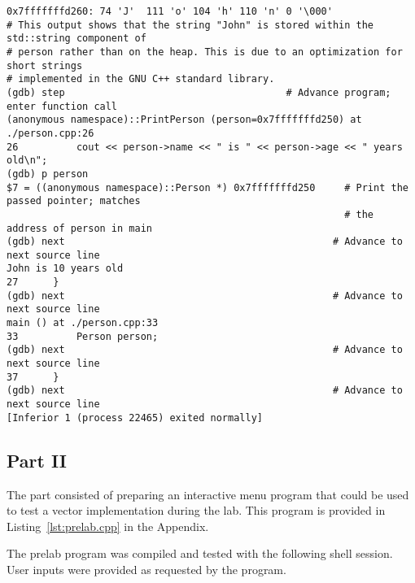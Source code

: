 \documentclass[11pt, letterpaper]{article} %
\begin{document}
\begin{lstlisting}[style=labreportstyle-sh,escapechar=!]
0x7fffffffd260: 74 'J'  111 'o' 104 'h' 110 'n' 0 '\000'
# This output shows that the string "John" is stored within the std::string component of
# person rather than on the heap. This is due to an optimization for short strings
# implemented in the GNU C++ standard library.
(gdb) step                                      # Advance program; enter function call
(anonymous namespace)::PrintPerson (person=0x7fffffffd250) at ./person.cpp:26
26          cout << person->name << " is " << person->age << " years old\n";
(gdb) p person
$7 = ((anonymous namespace)::Person *) 0x7fffffffd250     # Print the passed pointer; matches
                                                          # the address of person in main
(gdb) next                                              # Advance to next source line
John is 10 years old
27      }
(gdb) next                                              # Advance to next source line
main () at ./person.cpp:33
33          Person person;
(gdb) next                                              # Advance to next source line
37      }
(gdb) next                                              # Advance to next source line
[Inferior 1 (process 22465) exited normally]
\end{lstlisting}


\subsection*{Part II}
The part consisted of preparing an interactive menu program that could be used to test a vector implementation during the lab. This program is provided in Listing~\ref{lst:prelab.cpp} in the Appendix. 

The prelab program was compiled and tested with the following shell session. User inputs were provided as requested by the program.
\end{document}
